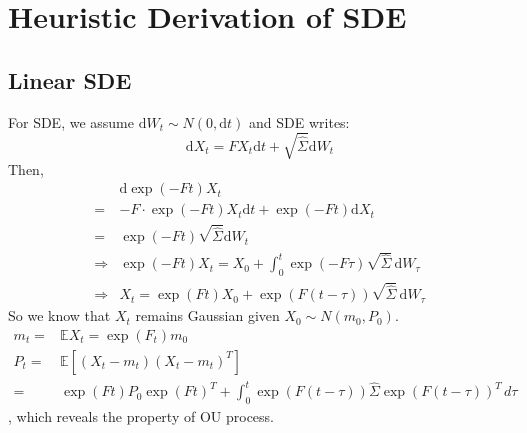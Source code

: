 \section{Heuristic Derivation of SDE}
\subsection{Linear SDE}
For SDE, we assume $\mathrm{d}W_t \sim N(0,\mathrm{d}t)$ and SDE writes:
$$
\mathrm{d}X_t = FX_t\mathrm{d}t + \sqrt{\widehat{\Sigma } } \mathrm{d}W_t
$$
Then,
\begin{equation*}
    \begin{aligned}
        &\mathrm{d}\exp(-Ft)X_t\\
        =&-F\cdot\exp(-Ft)X_t\mathrm{d}t+\exp(-Ft)\mathrm{d}X_t\\
        =&\exp(-Ft)\sqrt{\widehat{\Sigma}}\mathrm{d}W_t\\
        \Rightarrow& \exp(-Ft)X_t = X_0+\int_{0}^{t}  \exp(-F\tau)\sqrt{\widehat{\Sigma}}\,\mathrm{d}W_\tau\\
        \Rightarrow& X_t = \exp(Ft)X_0+\exp(F(t-\tau))\sqrt{\widehat{\Sigma}}\,\mathrm{d}W_\tau
    \end{aligned}
\end{equation*}
So we know that $X_t$ remains Gaussian given $X_0 \sim N(m_0,P_0)$.
\begin{equation*}
    \begin{aligned}
        m_t=&\mathbb{E} X_t = \exp(F_t)m_0\\
        P_t=&\mathbb{E}\left[ (X_t-m_t)(X_t-m_t)^T \right] \\
        =&\exp(Ft)P_0\exp(Ft)^T + \int_{0}^{t} \exp(F(t-\tau))\widehat{\Sigma}\exp(F(t-\tau))^T \,d\tau
    \end{aligned}
\end{equation*}
, which reveals the property of OU process.





